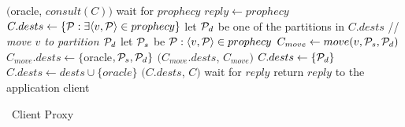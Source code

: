 \begin{algorithm}[h!]
\small

\begin{distribalgo}[1]

\vspace{1.0mm}


\vspace{1.0mm}

        \STATE \amcast$($oracle, $consult(C))$
        \STATE wait for $prophecy$
            \STATE $reply \leftarrow prophecy$
        \ELSE
            \STATE $C.dests \leftarrow \{\mathcal{P} : \exists \langle v, \mathcal{P} \rangle \in prophecy \}$
                \STATE let $\mathcal{P}_d$ be one of the partitions in $C.dests$
                    \STATE // \textit{move $v$ to partition $\mathcal{P}_d$}
                    \STATE let $\mathcal{P}_s$ be $\mathcal{P} : \langle v, \mathcal{P} \rangle \in prophecy$
                        \STATE $C_{move} \leftarrow move(v,\mathcal{P}_s,\mathcal{P}_d)$
                        \STATE $C_{move}.dests \leftarrow \{$oracle$,\mathcal{P}_s,\mathcal{P}_d\}$    
                        \STATE \amcast$(C_{move}.dests$, $C_{move})$
                    \ENDIF
                \ENDFOR
                \STATE $C.dests \leftarrow \{ \mathcal{P}_d \}$
            \ENDIF
                \STATE $C.dests \leftarrow dests \cup \{oracle\}$
            \ENDIF
            \STATE \amcast$(C.dests$, $C)$
            \STATE wait for $reply$
        \ENDIF
    \ENDINDENT
    \STATE return $reply$ to the application client
\ENDINDENT

\caption{\dssmr\ Client Proxy}
\label{alg:client_proxy}
\end{distribalgo}
\end{algorithm}